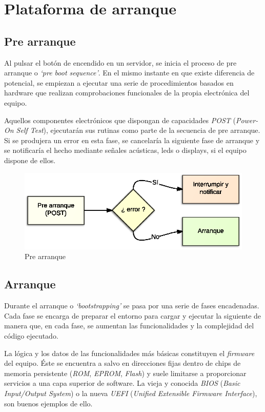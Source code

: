 \documentclass[a4paper,12pt,spanish,final]{epsc_tfc_pfc}
\begin{document}
\chapter{Plataforma de arranque}
\section{Pre arranque}
Al pulsar el botón de encendido en un servidor, se inicia el proceso de pre arranque o \emph{`pre boot sequence'}. En el mismo instante en que existe diferencia de potencial, se empiezan a ejecutar una serie de procedimientos basados en hardware que realizan comprobaciones funcionales de la propia electrónica del equipo.

Aquellos componentes electrónicos que dispongan de capacidades \emph{POST} (\emph{Power-On Self Test}), ejecutarán sus rutinas como parte de la secuencia de pre arranque. Si se produjera un error en esta fase, se cancelaría la siguiente fase de arranque y se notificaría el hecho mediante señales acústicas, leds o displays, si el equipo dispone de ellos.

\begin{figure}[h]
  \centering
    \includegraphics[scale=1]{pre_arranque}
      \caption{Pre arranque}
\end{figure}

\section{Arranque}
Durante el arranque o \emph{`bootstrapping'} se pasa por una serie de fases encadenadas. Cada fase se encarga de preparar el entorno para cargar y ejecutar la siguiente de manera que, en cada fase, se aumentan las funcionalidades y la complejidad del código ejecutado.

La lógica y los datos de las funcionalidades más básicas constituyen el \emph{firmware} del equipo. Éste se encuentra a salvo en direcciones fijas dentro de chips de memoria persistente (\emph{ROM}, \emph{EPROM}, \emph{Flash}) y suele limitarse a proporcionar servicios a una capa superior de software. La vieja y conocida \emph{BIOS} (\emph{Basic Input/Output System}) o la nueva \emph{UEFI} (\emph{Unified Extensible Firmware Interface}), son buenos ejemplos de ello.
\end{document}
